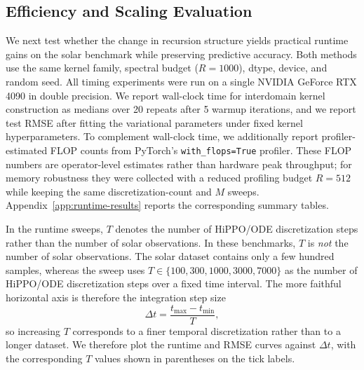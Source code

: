 \documentclass{article}
\theoremstyle{plain}
\theoremstyle{definition}
\theoremstyle{remark}
\begin{document}
\subsection{Efficiency and Scaling Evaluation}
\label{sec:runtime-scaling}

We next test whether the change in recursion structure yields practical runtime gains on the solar benchmark while preserving predictive accuracy. Both methods use the same kernel family, spectral budget ($R=1000$), dtype, device, and random seed. All timing experiments were run on a single NVIDIA GeForce RTX 4090 in double precision. We report wall-clock time for interdomain kernel construction as medians over 20 repeats after 5 warmup iterations, and we report test RMSE after fitting the variational parameters under fixed kernel hyperparameters. To complement wall-clock time, we additionally report profiler-estimated FLOP counts from PyTorch's \texttt{with\_flops=True} profiler. These FLOP numbers are operator-level estimates rather than hardware peak throughput; for memory robustness they were collected with a reduced profiling budget $R=512$ while keeping the same discretization-count and $M$ sweeps. Appendix~\ref{app:runtime-results} reports the corresponding summary tables.

In the runtime sweeps, $T$ denotes the number of HiPPO/ODE discretization steps rather than the number of solar observations. In these benchmarks, $T$ is \emph{not} the number of solar observations. The solar dataset contains only a few hundred samples, whereas the sweep uses $T \in \{100,300,1000,3000,7000\}$ as the number of HiPPO/ODE discretization steps over a fixed time interval. The more faithful horizontal axis is therefore the integration step size
\[
\Delta t = \frac{t_{\max} - t_{\min}}{T},
\]
so increasing $T$ corresponds to a finer temporal discretization rather than to a longer dataset. We therefore plot the runtime and RMSE curves against $\Delta t$, with the corresponding $T$ values shown in parentheses on the tick labels.
\end{document}

